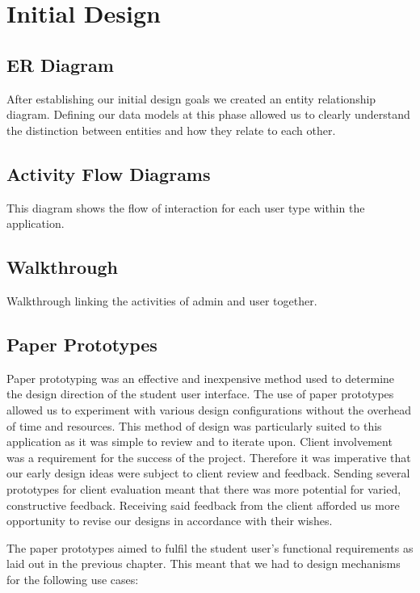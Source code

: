 \documentclass{l3proj}
\begin{document}
\section{Initial Design}

\subsection{ER Diagram}
	
After establishing our initial design goals we created an entity relationship diagram. Defining our data models at this phase allowed us to clearly understand the distinction between entities and how they relate to each other.



\subsection{Activity Flow Diagrams}
	
This diagram shows the flow of interaction for each user type within the application. 

\subsection{Walkthrough}
	
Walkthrough linking the activities of admin and user together.

\subsection{Paper Prototypes}

Paper prototyping was an effective and inexpensive method used to determine the design direction of the student user interface. The use of paper prototypes allowed us to experiment with various design configurations without the overhead of time and resources. This method of design was particularly suited to this application as it was simple to review and to iterate upon. Client involvement was a requirement for the success of the project. Therefore it was imperative that our early design ideas were subject to client review and feedback. Sending several prototypes for client evaluation meant that there was more potential for varied, constructive feedback. Receiving said feedback from the client afforded us more opportunity to revise our designs in accordance with their wishes. 

The paper prototypes aimed to fulfil the student user's functional requirements as laid out in the previous chapter. This meant that we had to design mechanisms for the following use cases:
\end{document}
